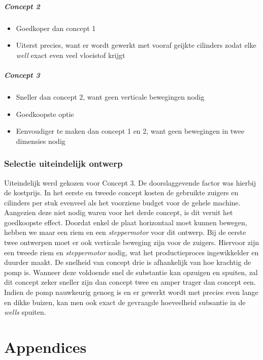 \documentclass[a4paper,twoside,kulak]{kulakreport} %
\begin{document}
\paragraph{Concept 2}
\begin{itemize}
	\item Goedkoper dan concept 1
	\item Uiterst precies, want er wordt gewerkt met vooraf geijkte cilinders zodat elke 	\textit{well} exact even veel vloeistof krijgt
\end{itemize}

\paragraph{Concept 3}
\begin{itemize}
	\item Sneller dan concept 2, want geen verticale bewegingen nodig
	\item Goedkoopste optie
	\item Eenvoudiger te maken dan concept 1 en 2, want geen bewegingen in twee dimensies nodig
\end{itemize}

\subsection{Selectie uiteindelijk ontwerp}
Uiteindelijk werd gekozen voor Concept 3. De doorslaggevende factor was hierbij de kostprijs. In het eerste en tweede concept kosten de gebruikte zuigers en cilinders per stuk evenveel als het voorziene budget voor de gehele machine. Aangezien deze niet nodig waren voor het derde concept, is dit veruit het goedkoopste effect. Doordat enkel de plaat horizontaal moet kunnen bewegen, hebben we maar een riem en een \textit{steppermotor} voor dit ontwerp. Bij de eerste twee ontwerpen moet er ook verticale beweging zijn voor de zuigers. Hiervoor zijn een tweede riem en \textit{steppermotor} nodig, wat het productieproces ingewikkelder en duurder maakt. De snelheid van concept drie is afhankelijk van hoe krachtig de pomp is. Wanneer deze voldoende snel de substantie kan opzuigen en spuiten, zal dit concept zeker sneller zijn dan concept twee en amper trager dan concept een. Indien de pomp nauwkeurig genoeg is en er gewerkt wordt met precies even lange en dikke buizen, kan men ook exact de gevraagde hoeveelheid subsantie in de \textit{wells} spuiten. 




\chapter*{Appendices}
\end{document}
